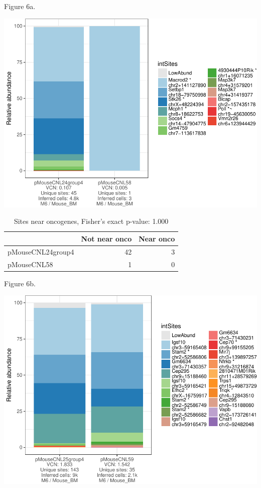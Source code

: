 \documentclass[12pt,]{article}
\begin{document}
\newpage

Figure 6a.

\includegraphics{project_files/figure-latex/unnamed-chunk-3-1.pdf}
\vspace{1.0cm}

\begin{table}[!h]

\caption{\label{tab:unnamed-chunk-3}Sites near oncogenes, Fisher's exact p-value: 1.000}
\centering
\begin{tabular}[t]{lrr}
\toprule
  & Not near onco & Near onco\\
\midrule
pMouseCNL24group4 & 42 & 3\\
pMouseCNL58 & 1 & 0\\
\bottomrule
\end{tabular}
\end{table}

\newpage

Figure 6b.

\includegraphics{project_files/figure-latex/unnamed-chunk-3-2.pdf}
\vspace{1.0cm}
\end{document}
